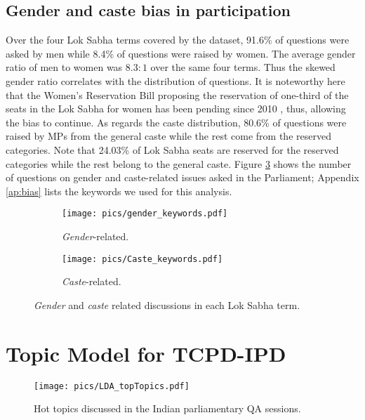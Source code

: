 \documentclass[10pt, a4paper]{article}
\begin{document}
    \subsection{Gender and caste bias in participation} 
    Over the four Lok Sabha terms covered by the dataset, 91.6\% of questions were asked by men while 8.4\% of questions were raised by women. The average gender ratio of men to women was $8.3 \!\!:\!\! 1$ over the same four terms. Thus the skewed gender ratio correlates with the distribution of questions. It is noteworthy here that the Women's Reservation Bill proposing the reservation of one-third of the seats in the Lok Sabha for women has been pending since 2010 \cite{marwah2019gender}, thus, allowing the bias to continue. As regards the caste distribution, 80.6\% of questions were raised by MPs from the general caste while the rest come from the reserved categories. Note that 24.03\% of Lok Sabha seats are reserved for the reserved categories while the rest belong to the general caste. Figure \ref{fig:Bias_analysis} shows the number of questions on gender and caste-related issues asked in the Parliament;  Appendix \ref{ap:bias} lists the keywords we used for this  analysis.
    
    \begin{figure}[!htbp]
    \centering 
    \begin{subfigure}[b]{0.49\linewidth}
        \texttt{[image: pics/gender\_keywords.pdf]}
        \caption{\textit{Gender}-related.}
        \label{fig:Gender_bias}
    \end{subfigure} \hfill
    \begin{subfigure}[b]{0.49\linewidth}
        \texttt{[image: pics/Caste\_keywords.pdf]}
        \caption{\textit{Caste}-related.}
        \label{fig:Caste_bias}
    \end{subfigure}
    \caption{\textit{Gender} and \textit{caste} related discussions in each Lok Sabha term.}
    \label{fig:Bias_analysis}
\end{figure}


\section{Topic Model for TCPD-IPD}
\label{sec:globalTopics}
\begin{figure}
\centering
\texttt{[image: pics/LDA\_topTopics.pdf]}
\captionsetup{justification=centering}
\caption{Hot topics discussed in the Indian parliamentary QA sessions.} 
\label{fig:HotTopics}
\end{figure} 
\end{document}
